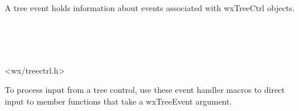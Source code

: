\section{}\label{wxtreeevent}

A tree event holds information about events associated with wxTreeCtrl objects.


\\
\\
\\


<wx/treectrl.h>


To process input from a tree control, use these event handler macros to direct input to member
functions that take a wxTreeEvent argument.

